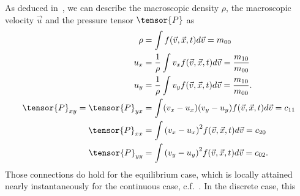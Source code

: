 As deduced in~\cite[pages 23 ff.]{harris2004introduction}, we can describe the macroscopic density $\rho$, the macroscopic velocity $\vec{u}$ and the pressure tensor $\tensor{P}$ as
\begin{equation}
  \begin{aligned}
    \rho & = \int f (\vec{v},\vec{x},t) d\vec{v} = m_{00} \\
    u_x
    & = \frac{1}{\rho}\int v_x f(\vec{v},\vec{x},t) d\vec{v} = \frac{ m_{10} }{ m_{00} }\\
    u_y
    & = \frac{1}{\rho}\int v_y f(\vec{v},\vec{x},t) d\vec{v} = \frac{ m_{10} }{ m_{00} }.\\
    \tensor{P}_{xy}=\tensor{P}_{yx}
    & = \int (v_x - u_x)(v_y - u_y) f(\vec{v},\vec{x},t) d\vec{v}
      = c_{11} \\
    \tensor{P}_{xx}
    & = \int {(v_x - u_x)}^2 f(\vec{v},\vec{x},t) d\vec{v}
      = c_{20} \\
    \tensor{P}_{yy}
    & = \int {(v_y - u_y)}^2 f(\vec{v},\vec{x},t) d\vec{v}
      = c_{02} .
  \end{aligned}
\end{equation}
Those connections do hold for the equilibrium case, which is locally attained nearly instantaneously for the continuous case, c.f.~\cite[page 218]{smits2000physical}. In the discrete case, this 


